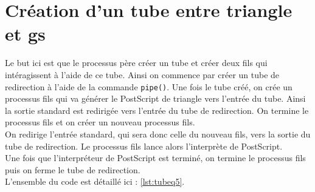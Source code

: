 \section{Création d'un tube entre triangle et gs}

Le but ici est que le processus père créer un tube et créer deux fils qui intéragissent à l'aide de ce tube.
Ainsi on commence par créer un tube de redirection à l'aide de la commande \verb!pipe()!.
Une fois le tube créé, on crée un processus fils qui va générer le PostScript de triangle vers l'entrée du tube.
Ainsi la sortie standard est redirigée vers l'entrée du tube de redirection.
On termine le processus fils et on créer un nouveau processus fils.\\
On redirige l'entrée standard, qui sera donc celle du nouveau fils, vers la sortie du tube de redirection.
Le processus fils lance alors l'interprète de PostScript.\\
Une fois que l'interpréteur de PostScript est terminé, on termine le processus fils puis on ferme le tube de redirection.\\
L'ensemble du code est détaillé ici : \ref{lst:tubeq5}.

